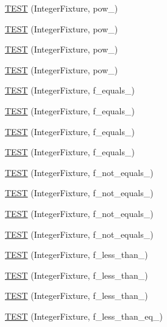 \begin{DoxyCompactItemize}
\item 
\hyperlink{TestInteger_8c_09_09_a5480a05817d3837abf600a4c0d3859a6}{T\-E\-S\-T} (Integer\-Fixture, pow\-\_)
\item 
\hyperlink{TestInteger_8c_09_09_a76eb8a7424eceb31fc9f9aff25bfcc5b}{T\-E\-S\-T} (Integer\-Fixture, pow\-\_)
\item 
\hyperlink{TestInteger_8c_09_09_a11de2836e19f8d16cbf45eda24a25e2e}{T\-E\-S\-T} (Integer\-Fixture, pow\-\_)
\item 
\hyperlink{TestInteger_8c_09_09_a5faed6e075e626d924a5038010e24ed1}{T\-E\-S\-T} (Integer\-Fixture, pow\-\_)
\item 
\hyperlink{TestInteger_8c_09_09_a3030d897766f58ca575f5aa8be6e7ff3}{T\-E\-S\-T} (Integer\-Fixture, f\-\_\-equals\-\_)
\item 
\hyperlink{TestInteger_8c_09_09_a5f2176aa8f9be74c7ec71bb1fc1a7b5a}{T\-E\-S\-T} (Integer\-Fixture, f\-\_\-equals\-\_)
\item 
\hyperlink{TestInteger_8c_09_09_a212bf77a1bb45dbfc2dee9d0902c6ab0}{T\-E\-S\-T} (Integer\-Fixture, f\-\_\-equals\-\_)
\item 
\hyperlink{TestInteger_8c_09_09_abde0188fadc7e8b7bda767c42de77500}{T\-E\-S\-T} (Integer\-Fixture, f\-\_\-equals\-\_)
\item 
\hyperlink{TestInteger_8c_09_09_a17d2c4b9aecb504b5ad648902bbbff9f}{T\-E\-S\-T} (Integer\-Fixture, f\-\_\-not\-\_\-equals\-\_)
\item 
\hyperlink{TestInteger_8c_09_09_a7223fe1424f2838d9de6e2d8e09e52bf}{T\-E\-S\-T} (Integer\-Fixture, f\-\_\-not\-\_\-equals\-\_)
\item 
\hyperlink{TestInteger_8c_09_09_a99788ee595f09f53f623a74234204bfd}{T\-E\-S\-T} (Integer\-Fixture, f\-\_\-not\-\_\-equals\-\_)
\item 
\hyperlink{TestInteger_8c_09_09_a844d0e36f0242e44fed4bc2a0d7593ec}{T\-E\-S\-T} (Integer\-Fixture, f\-\_\-not\-\_\-equals\-\_)
\item 
\hyperlink{TestInteger_8c_09_09_a8bef4df25d3edab3ce563c909519073a}{T\-E\-S\-T} (Integer\-Fixture, f\-\_\-less\-\_\-than\-\_)
\item 
\hyperlink{TestInteger_8c_09_09_a1b22f5f2fd068303f9478e073e0da5b0}{T\-E\-S\-T} (Integer\-Fixture, f\-\_\-less\-\_\-than\-\_)
\item 
\hyperlink{TestInteger_8c_09_09_ac98c8fc00d9541ab1058a48c339e9e1b}{T\-E\-S\-T} (Integer\-Fixture, f\-\_\-less\-\_\-than\-\_)
\item 
\hyperlink{TestInteger_8c_09_09_ac8421d10450d41bd63000cc3563cce71}{T\-E\-S\-T} (Integer\-Fixture, f\-\_\-less\-\_\-than\-\_\-eq\-\_)

\end{DoxyCompactItemize}
